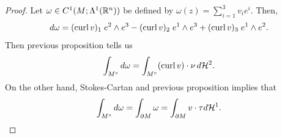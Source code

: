 \documentclass[a4paper]{article}
\begin{document}
\begin{proof}
  Let $\omega \in C^1(M; \Lambda^1(\mathbb{R}^n))$ be defined by $\omega(z) =
    \sum_{i=1}^3 v_i e^i$. Then,
  \[
    d \omega = (\operatorname{curl} v)_1 \; e^2 \wedge e^3
    - (\operatorname{curl} v)_2 \; e^1 \wedge e^3
    + (\operatorname{curl} v)_3 \; e^1 \wedge e^2.
  \]
  Then previous proposition tells us
  \[
    \int_{M^\circ} d \omega
    = \int_{M^\circ} (\operatorname{curl} v) \cdot \nu \, d \mathcal{H}^2.
  \]
  On the other hand, Stokes-Cartan and previous proposition implies that
  \[
    \int_{M^\circ} d \omega = \int_{\partial M} \omega
    = \int_{\partial M} v \cdot \tau d \mathcal{H}^1.
  \]
\end{proof}
\end{document}
